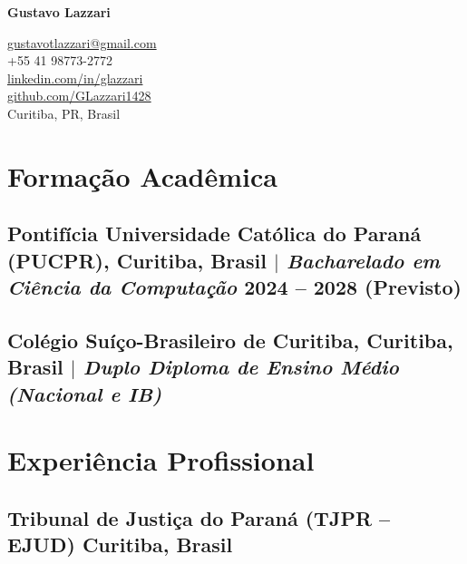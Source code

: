 \documentclass[11pt]{article} %
\begin{document}
\begin{center}
	\begin{minipage}{0.5\textwidth} %
		{\Huge\bfseries
			Gustavo Lazzari %
		} \\ \medskip
	\end{minipage} \hfill %
	\begin{minipage}{0.4\textwidth} %
		\raggedleft %
		\href{mailto:gustavotlazzari@gmail.com}{gustavotlazzari@gmail.com} \\
		+55 41 98773-2772 \\
		\href{https://www.linkedin.com/in/glazzari/}{linkedin.com/in/glazzari} \\
		\href{https://github.com/GLazzari1428}{github.com/GLazzari1428} \\
        Curitiba, PR, Brasil
	\end{minipage}
\end{center}
\vspace{-4mm} %


\section{Formação Acadêmica}
\subsection{Pontifícia Universidade Católica do Paraná (PUCPR), Curitiba, Brasil $|$ {\normalfont\itshape Bacharelado em Ciência da Computação} \hfill 2024 -- 2028 (Previsto)}

\subsection{Colégio Suíço-Brasileiro de Curitiba, Curitiba, Brasil $|$ {\normalfont\itshape Duplo Diploma de Ensino Médio (Nacional e IB)} \hfill }

\section{Experiência Profissional}
\subsection{Tribunal de Justiça do Paraná (TJPR – EJUD) \hfill Curitiba, Brasil}
\end{document}
